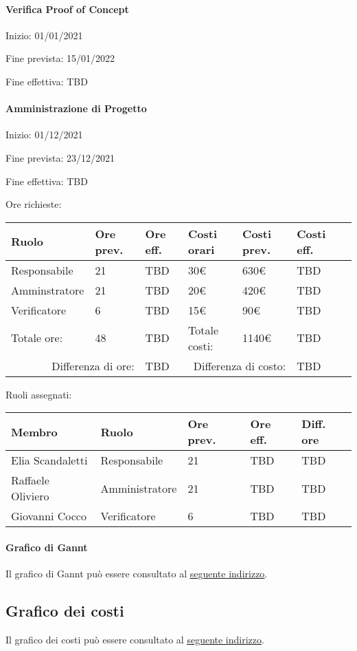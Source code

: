 \documentclass[a4paper, 12pt]{article}
\begin{document}
\paragraph{Verifica Proof of Concept}
Inizio: 01/01/2021\par
Fine prevista: 15/01/2022\par
Fine effettiva: TBD

\paragraph{Amministrazione di Progetto}
Inizio: 01/12/2021\par
Fine prevista: 23/12/2021\par
Fine effettiva: TBD

Ore richieste:\\[0.5em]
\begin{tabular}{|l|l|l||l|l|l|l|}\hline
Ruolo & Ore prev. & Ore eff. & Costi orari & Costi prev. & Costi eff.\\\hline
Responsabile & 21 & TBD & 30\euro & 630\euro & TBD \\\hline
Amminstratore & 21 & TBD & 20\euro & 420\euro & TBD \\\hline
Verificatore & 6 & TBD & 15\euro & 90\euro & TBD \\\hline
Totale ore: & 48 & TBD & Totale costi: & 1140\euro & TBD \\\hline
\multicolumn{2}{|r|}{Differenza di ore:} & TBD & \multicolumn{2}{r|}{Differenza di costo:} & TBD \\\hline
\end{tabular}

Ruoli assegnati:\\[0.5em]
\begin{tabular}{|l|l|l|l|l|}\hline
Membro & Ruolo & Ore prev. & Ore eff. & Diff. ore \\\hline
Elia Scandaletti & Responsabile & 21 & TBD & TBD \\\hline
Raffaele Oliviero & Amministratore & 21 & TBD & TBD \\\hline
Giovanni Cocco & Verificatore & 6 & TBD & TBD \\\hline
\end{tabular}

\paragraph{Grafico di Gannt}
Il grafico di Gannt può essere consultato al \underline{\href{https://docs.google.com/spreadsheets/d/e/2PACX-1vRd4970Fob6KlNwY1iV6bnHZXNl41F74utFkkc9ykuT1NUEGLnFcCd4rOHbXjW99ichDnkV3cEGCmWi/pubhtml?gid=1972921762}{seguente indirizzo}}.


\subsection{Grafico dei costi}
Il grafico dei costi può essere consultato al \underline{\href{https://docs.google.com/spreadsheets/d/e/2PACX-1vRd4970Fob6KlNwY1iV6bnHZXNl41F74utFkkc9ykuT1NUEGLnFcCd4rOHbXjW99ichDnkV3cEGCmWi/pubhtml?gid=263680959}{seguente indirizzo}}.
\end{document}
